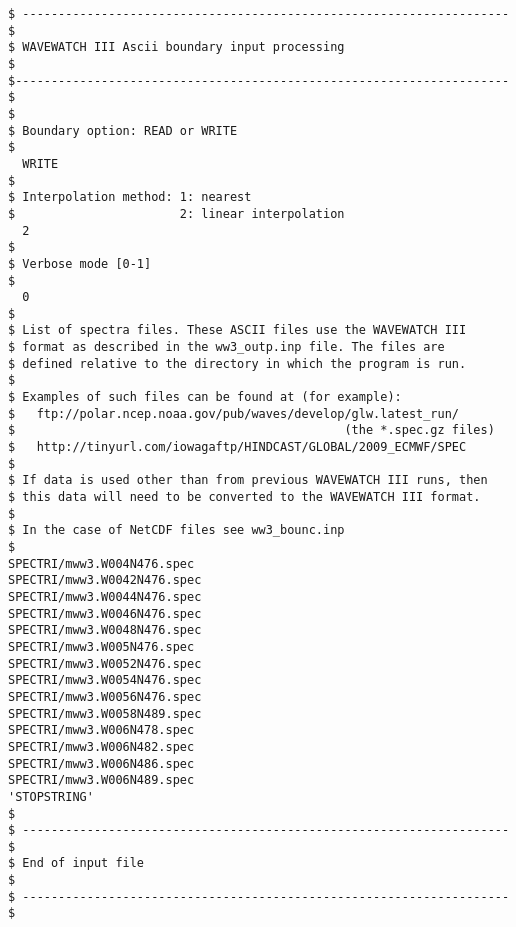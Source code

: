 \begin{footnotesize}
\begin{verbatim}
$ -------------------------------------------------------------------- $
$ WAVEWATCH III Ascii boundary input processing                        $
$--------------------------------------------------------------------- $
$
$ Boundary option: READ or WRITE
$
  WRITE 
$
$ Interpolation method: 1: nearest
$                       2: linear interpolation
  2 
$
$ Verbose mode [0-1]
$
  0
$
$ List of spectra files. These ASCII files use the WAVEWATCH III
$ format as described in the ww3_outp.inp file. The files are 
$ defined relative to the directory in which the program is run.
$
$ Examples of such files can be found at (for example): 
$   ftp://polar.ncep.noaa.gov/pub/waves/develop/glw.latest_run/
$                                              (the *.spec.gz files)
$   http://tinyurl.com/iowagaftp/HINDCAST/GLOBAL/2009_ECMWF/SPEC
$
$ If data is used other than from previous WAVEWATCH III runs, then
$ this data will need to be converted to the WAVEWATCH III format.
$
$ In the case of NetCDF files see ww3_bounc.inp  
$
SPECTRI/mww3.W004N476.spec
SPECTRI/mww3.W0042N476.spec
SPECTRI/mww3.W0044N476.spec
SPECTRI/mww3.W0046N476.spec
SPECTRI/mww3.W0048N476.spec
SPECTRI/mww3.W005N476.spec
SPECTRI/mww3.W0052N476.spec
SPECTRI/mww3.W0054N476.spec
SPECTRI/mww3.W0056N476.spec
SPECTRI/mww3.W0058N489.spec
SPECTRI/mww3.W006N478.spec
SPECTRI/mww3.W006N482.spec
SPECTRI/mww3.W006N486.spec
SPECTRI/mww3.W006N489.spec
'STOPSTRING'
$ 
$ -------------------------------------------------------------------- $
$ End of input file                                                    $
$ -------------------------------------------------------------------- $
\end{verbatim}
\end{footnotesize}
